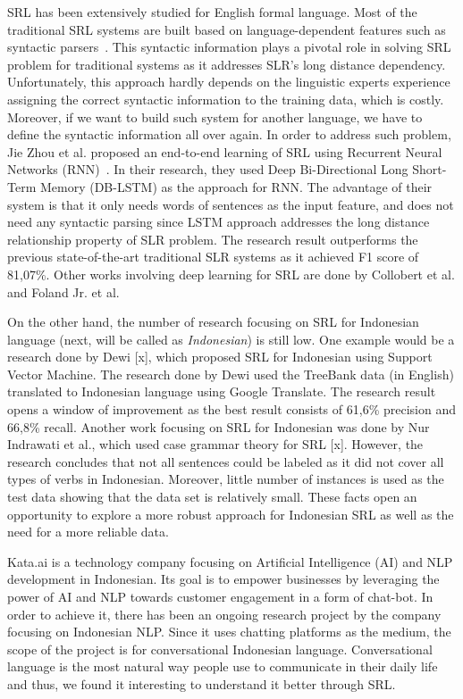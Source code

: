 SRL has been extensively studied for English formal language. Most of the traditional SRL systems are built based on language-dependent features such as syntactic parsers~\citep{gildea2002automatic, gildea2002necessity, pradhan2005semantic}. This syntactic information plays a pivotal role in solving SRL problem for traditional systems as it addresses SLR’s long distance dependency. Unfortunately, this approach hardly depends on the linguistic experts experience assigning the correct syntactic information to the training data, which is costly. Moreover, if we want to build such system for another language, we have to define the syntactic information all over again. In order to address such problem, Jie Zhou et al. proposed an end-to-end learning of SRL using Recurrent Neural Networks (RNN)~\citep{zhou2015end}. In their research, they used Deep Bi-Directional Long Short-Term Memory (DB-LSTM) as the approach for RNN. The advantage of their system is that it only needs words of sentences as the input feature, and does not need any syntactic parsing since LSTM approach addresses the long distance relationship property of SLR problem. The research result outperforms the previous state-of-the-art traditional SLR systems as it achieved F1 score of 81,07\%. Other works involving deep learning for SRL are done by Collobert et al. and Foland Jr. et al.

On the other hand, the number of research focusing on SRL for Indonesian language (next, will be called as \textit{Indonesian}) is still low. One example would be a research done by Dewi [x], which proposed SRL for Indonesian using Support Vector Machine. The research done by Dewi used the TreeBank data (in English) translated to Indonesian language using Google Translate. The research result opens a window of improvement as the best result consists of 61,6\% precision and 66,8\% recall. Another work focusing on SRL for Indonesian was done by Nur Indrawati et al., which used case grammar theory for SRL [x]. However, the research concludes that not all sentences could be labeled as it did not cover all types of verbs in Indonesian. Moreover, little number of instances is used as the test data showing that the data set is relatively small. These facts open an opportunity to explore a more robust approach for Indonesian SRL as well as the need for a more reliable data.

Kata.ai is a technology company focusing on Artificial Intelligence (AI) and NLP development in Indonesian. Its goal is to empower businesses by leveraging the power of AI and NLP towards customer engagement in a form of chat-bot. In order to achieve it, there has been an ongoing research project by the company focusing on Indonesian NLP. Since it uses chatting platforms as the medium, the scope of the project is for conversational Indonesian language. Conversational language is the most natural way people use to communicate in their daily life and thus, we found it interesting to understand it better through SRL.

